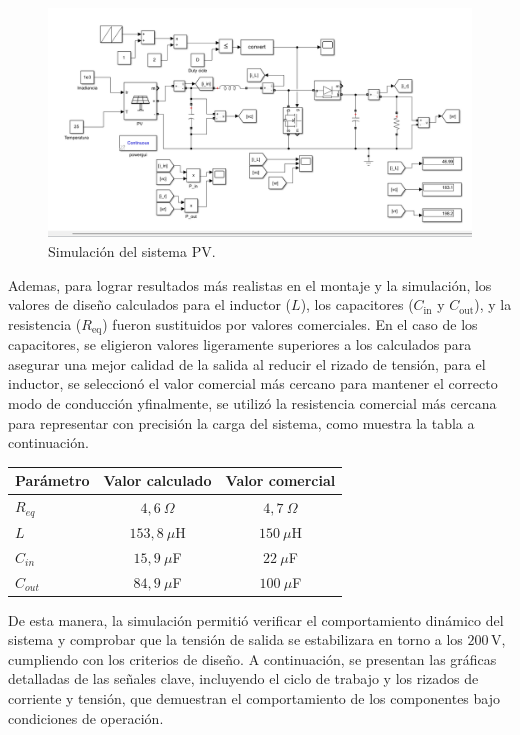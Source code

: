 \begin{figure}[h!]
    \centering
    \includegraphics[width=1\linewidth]{fot/simulacion.png} %
    \caption{Simulación del sistema PV.}
    \label{fig:simulacion_pv}
\end{figure}


Ademas, para lograr resultados más realistas en el montaje y la simulación, los valores de diseño calculados para el inductor ($L$), los capacitores ($C_{\text{in}}$ y $C_{\text{out}}$), y la resistencia ($R_{\text{eq}}$) fueron sustituidos por valores comerciales. En el caso de los capacitores, se eligieron valores ligeramente superiores a los calculados para asegurar una mejor calidad de la salida al reducir el rizado de tensión, para el inductor, se seleccionó el valor comercial más cercano para mantener el correcto modo de conducción yfinalmente, se utilizó la resistencia comercial más cercana para representar con precisión la carga del sistema, como muestra la tabla a continuación.
 

\begin{table}[ht!]
\centering
\begin{tabular}{l c c}
\hline
Parámetro & Valor calculado & Valor comercial \\
\hline
$R_{eq}$   & $4,6\ \Omega$   & $4,7\ \Omega$ \\
$L$        & $153,8\ \mu$H   & $150\ \mu$H \\
$C_{in}$   & $15,9\ \mu$F    & $22\ \mu$F \\
$C_{out}$  & $84,9\ \mu$F    & $100\ \mu$F \\
\hline
\end{tabular}
\end{table}

De esta manera, la simulación permitió verificar el comportamiento dinámico del sistema y comprobar que la tensión de salida se estabilizara en torno a los $200 \,\text{V}$, cumpliendo con los criterios de diseño.  A continuación, se presentan las gráficas detalladas de las señales clave, incluyendo el ciclo de trabajo y los rizados de corriente y tensión, que demuestran el comportamiento de los componentes bajo condiciones de operación.

